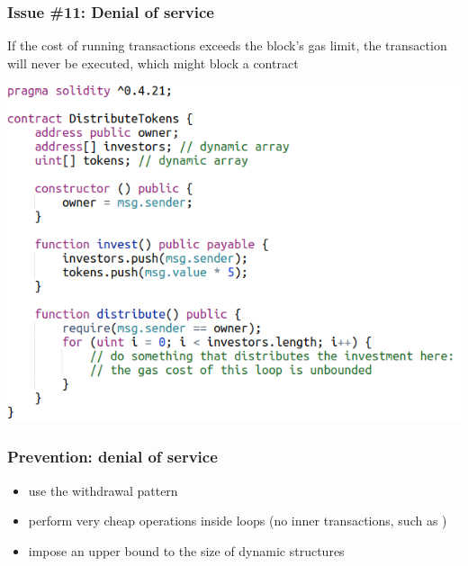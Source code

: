 \documentclass[11pt]{beamer}  %
\def\codesize{\smaller}
\def\<#1>{\codeid{#1}}
\newcommand{\codeid}[1]{\ifmmode{\mbox{\codesize\ttfamily{#1}}}\else{\codesize\ttfamily #1}\fi}
\begin{document}
\begin{frame}\frametitle{Issue \#11: Denial of service}

  \begin{redbox}{}
    If the cost of running transactions exceeds the block's gas limit, the
    transaction will never be executed, which might block a contract
  \end{redbox}

  \begin{center}
    \includegraphics[scale=0.35,clip=false]{pictures/distribute-tokens.png}
  \end{center}

\end{frame}

\begin{frame}\frametitle{Prevention: denial of service}
  \begin{itemize}
  \item use the withdrawal pattern
  \item perform very cheap operations inside loops (no inner transactions, such as \<send>)
  \item impose an upper bound to the size of dynamic structures
  \end{itemize}
\end{frame}
\end{document}
